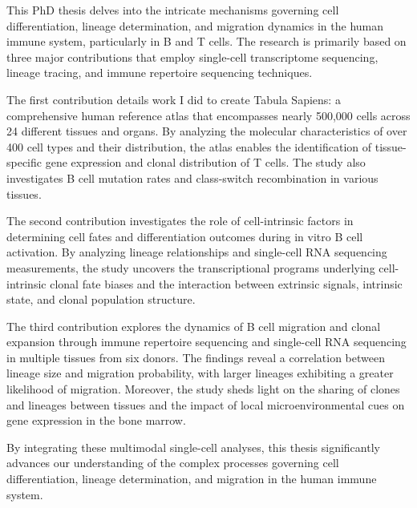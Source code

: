 This PhD thesis delves into the intricate mechanisms governing cell differentiation, lineage determination, and migration dynamics in the human immune system, particularly in B and T cells. The research is primarily based on three major contributions that employ single-cell transcriptome sequencing, lineage tracing, and immune repertoire sequencing techniques.

The first contribution details work I did to create Tabula Sapiens: a comprehensive human reference atlas that encompasses nearly 500,000 cells across 24 different tissues and organs. By analyzing the molecular characteristics of over 400 cell types and their distribution, the atlas enables the identification of tissue-specific gene expression and clonal distribution of T cells. The study also investigates B cell mutation rates and class-switch recombination in various tissues.

The second contribution investigates the role of cell-intrinsic factors in determining cell fates and differentiation outcomes during in vitro B cell activation. By analyzing lineage relationships and single-cell RNA sequencing measurements, the study uncovers the transcriptional programs underlying cell-intrinsic clonal fate biases and the interaction between extrinsic signals, intrinsic state, and clonal population structure. 

The third contribution explores the dynamics of B cell migration and clonal expansion through immune repertoire sequencing and single-cell RNA sequencing in multiple tissues from six donors. The findings reveal a correlation between lineage size and migration probability, with larger lineages exhibiting a greater likelihood of migration. Moreover, the study sheds light on the sharing of clones and lineages between tissues and the impact of local microenvironmental cues on gene expression in the bone marrow.

By integrating these multimodal single-cell analyses, this thesis significantly advances our understanding of the complex processes governing cell differentiation, lineage determination, and migration in the human immune system. 